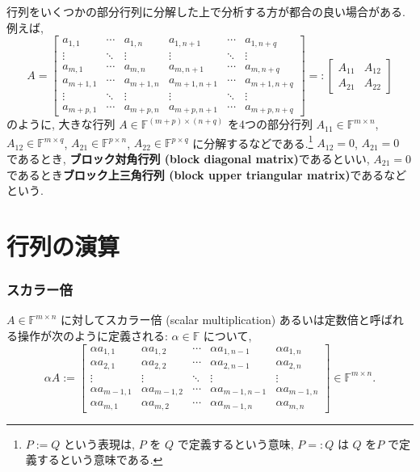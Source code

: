 \documentclass[a4paper]{scrbook}
\theoremstyle{definition}
\begin{document}
行列をいくつかの部分行列に分解した上で分析する方が都合の良い場合がある.
例えば, \[
A=\left[
  \begin{array}{ccc|ccc}
    a_{1,1} & \cdots & a_{1,n} & a_{1,n+1} & \cdots & a_{1,n+q}\\
    \vdots & \ddots & \vdots & \vdots & \ddots & \vdots\\
    a_{m,1} & \cdots & a_{m,n} & a_{m,n+1} & \cdots & a_{m,n+q}\\
    \hline a_{m+1,1} & \cdots & a_{m+1,n} & a_{m+1,n+1} & \cdots & a_{m+1,n+q}\\
    \vdots & \ddots & \vdots & \vdots & \ddots & \vdots\\
    a_{m+p,1} & \cdots & a_{m+p,n} & a_{m+p,n+1} & \cdots & a_{m+p,n+q}
  \end{array}
  \right]
  =:
  \left[
    \begin{array}{c|c}
      A_{11} & A_{12}\\
      \hline 
      A_{21} & A_{22}
    \end{array}
  \right]
\] のように, 大きな行列 \(A\in\mathbb{F}^{(m+p)\times(n+q)}\)
を4つの部分行列 \(A_{11}\in\mathbb{F}^{m\times n}\),
\(A_{12}\in\mathbb{F}^{m\times q}\),
\(A_{21}\in\mathbb{F}^{p\times n}\), \(A_{22}\in\mathbb{F}^{p\times q}\)
に分解するなどである.\footnote{\(P:=Q\) という表現は, \(P\) を \(Q\)
  で定義するという意味, \(P =:Q\) は \(Q\) を\(P\)
  で定義するという意味である.} \(A_{12}=0\), \(A_{21}=0\) であるとき,
\textbf{ブロック対角行列 (block diagonal matrix)}であるといい,
\(A_{21}=0\) であるとき\textbf{ブロック上三角行列 (block upper
triangular matrix)}であるなどという.

\section{行列の演算}

\subsubsection*{スカラー倍}

\(A\in\mathbb{F}^{m\times n}\) に対してスカラー倍 (scalar
multiplication) あるいは定数倍と呼ばれる操作が次のように定義される:
\(\alpha\in\mathbb{F}\) について, \[
\alpha A:=\begin{bmatrix}\alpha a_{1,1} & \alpha a_{1,2} & \cdots & \alpha a_{1,n-1} & \alpha a_{1,n}\\
\alpha a_{2,1} & \alpha a_{2,2} & \cdots & \alpha a_{2,n-1} & \alpha a_{2,n}\\
\vdots & \vdots & \ddots & \vdots & \vdots\\
\alpha a_{m-1,1} & \alpha a_{m-1,2} & \cdots & \alpha a_{m-1,n-1} & \alpha a_{m-1,n}\\
\alpha a_{m,1} & \alpha a_{m,2} & \cdots & \alpha a_{m-1,n} & \alpha a_{m,n}
\end{bmatrix}\in\mathbb{F}^{m\times n}.
\]
\end{document}
